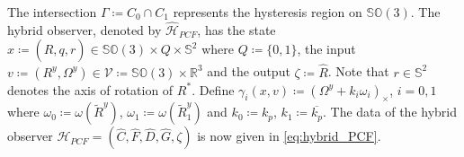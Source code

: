 \documentclass{article}
\newcommand{\SOthree}{\mathbb{SO}(3)}
\newcommand{\sothree}{\mathfrak{so}(3)}
\newcommand{\R}[1]{\mathbb{R}^{#1}}
\newcommand{\Omegay}{\Omega^y}
\newcommand{\Rtilde}{\tilde{R}}
\newcommand{\normSOthree}[1]{{{\vert}#1 {\vert}_I}}
\newcommand{\Rstar}{{R^*}}
\begin{document}


The intersection $\Gamma \coloneqq C_0\cap C_1$ represents the hysteresis region on $\SOthree$. The hybrid observer, denoted by $\hat{\mathcal{H}}_{PCF}$, has the state $x \coloneqq (\hat{R}, q, r) \in \SOthree \times Q \times \mathbb{S}^2$ where $Q\coloneqq \{0,1\}$, the input $v \coloneqq (R^y, \Omega^y)\in \mathcal{V}\coloneqq \SOthree\times \R{3}$ and the output $\zeta \coloneqq \hat{R}$. Note that $r\in\mathbb{S}^2$ denotes the axis of rotation of $\Rstar$. Define $\gamma_i(x, v) \coloneqq (\Omegay + k_i\omega_i)_\times$, $i=0,1$ where $\omega_0 \coloneqq \omega(\Rtilde^y)$, $\omega_1 \coloneqq \omega(\Rtilde_1^y)$ and $k_0 \coloneqq k_p$, $k_1\coloneqq \overline{k_p}$. The data of the hybrid observer $\mathcal{H}_{PCF} = (\hat{C}, \hat{F}, \hat{D}, \hat{G}, \zeta)$ is now given in \eqref{eq:hybrid_PCF}. 
\end{document}
